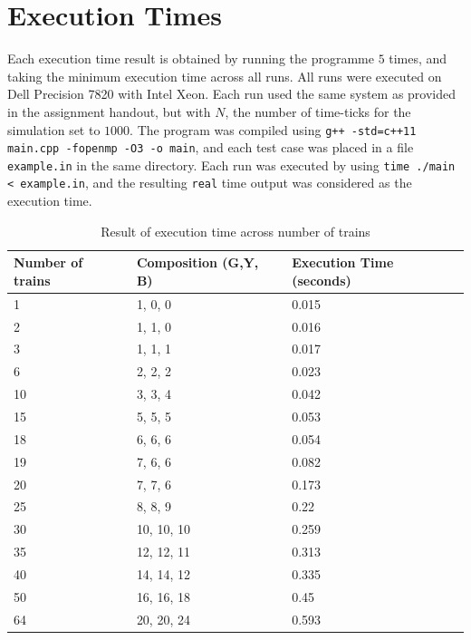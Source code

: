 \documentclass[12pt]{article}
\begin{document}
\section{Execution Times}

Each execution time result is obtained by running the programme $5$ times, and taking the minimum execution time across all runs. All runs were executed on Dell Precision 7820 with Intel Xeon. Each run used the same system as provided in the assignment handout, but with $N$, the number of time-ticks for the simulation set to $1000$. The program was compiled using \verb!g++ -std=c++11 main.cpp -fopenmp -O3 -o main!, and each test case was placed in a file \verb!example.in! in the same directory. Each run was executed by using \verb!time ./main < example.in!, and the resulting \verb!real! time output was considered as the execution time.

\begin{table}[]
\begin{tabular}{|l|l|l|}
\hline
Number of trains & Composition (G,Y, B) & Execution Time (seconds) \\ \hline
1                & 1, 0, 0              & 0.015                    \\ \hline
2                & 1, 1, 0              & 0.016                    \\ \hline
3                & 1, 1, 1              & 0.017                    \\ \hline
6                & 2, 2, 2              & 0.023                    \\ \hline
10               & 3, 3, 4              & 0.042                    \\ \hline
15               & 5, 5, 5              & 0.053                    \\ \hline
18               & 6, 6, 6              & 0.054                    \\ \hline
19               & 7, 6, 6              & 0.082                    \\ \hline
20               & 7, 7, 6              & 0.173                    \\ \hline
25               & 8, 8, 9              & 0.22                     \\ \hline
30               & 10, 10, 10           & 0.259                    \\ \hline
35               & 12, 12, 11           & 0.313                    \\ \hline
40               & 14, 14, 12           & 0.335                    \\ \hline
50               & 16, 16, 18           & 0.45                     \\ \hline
64               & 20, 20, 24           & 0.593                    \\ \hline
\end{tabular}
\caption{Result of execution time across number of trains}
\end{table}
\end{document}
